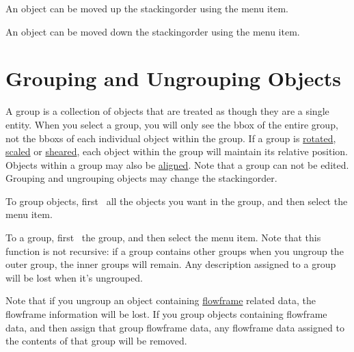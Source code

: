 
An object can be moved up the \gls{stackingorder} using
the  menu item.


An object can be moved down the \gls{stackingorder} using
the  menu item.


\section{Grouping and Ungrouping Objects}\label{sec:grouping}

A \gls{group} is a collection of \glspl{object} that are treated as
though they are a single entity. When you select a \gls{group}, you
will only see the \gls{bbox} of the entire group, not the
\glspl*{bbox} of each individual object within the group. If a
\gls{group} is \hyperref[sec:rotateobjects]{rotated},
\hyperref[sec:scaleobjects]{scaled} or \hyperref[sec:shearobjects]{sheared}, each
\gls*{object} within the group will maintain its relative position.
Objects within a \gls{group} may also be
\hyperref[sec:alignobjects]{aligned}.  Note that a \gls{group} can
not be edited. Grouping and ungrouping \glspl*{object} may change
the \gls{stackingorder}.


To group \glspl*{object}, first \select\
all the objects you want in the \gls{group}, and then select the
\menu{transform.group} menu item.


To  a group, first \select\ the
group, and then select the  menu item. Note
that this function is not recursive: if a group contains other
groups when you ungroup the outer group, the inner groups will
remain.  Any description assigned to a group will be lost when it's
ungrouped.

\begin{warning}
Note that if you ungroup an \gls*{object} containing
\hyperref[sec:flowframe]{flowframe} related
data, the \gls{flowframe} information will be lost. If you group objects
containing flowframe data, and then assign that group flowframe data,
any flowframe data assigned to the contents of that group will be
removed.
\end{warning}



